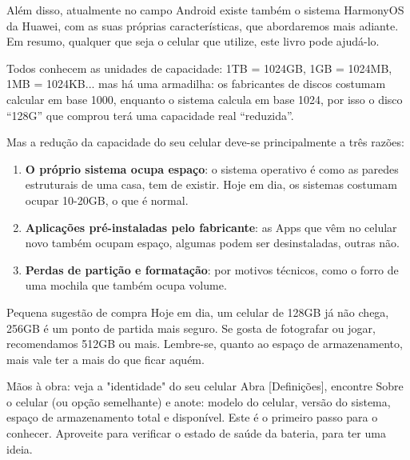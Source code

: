 Além disso, atualmente no campo Android existe também o sistema HarmonyOS da Huawei, com as suas próprias características, que abordaremos mais adiante. Em resumo, qualquer que seja o celular que utilize, este livro pode ajudá-lo.


Todos conhecem as unidades de capacidade: 1TB = 1024GB, 1GB = 1024MB, 1MB = 1024KB... mas há uma armadilha: os fabricantes de discos costumam calcular em base 1000, enquanto o sistema calcula em base 1024, por isso o disco “128G” que comprou terá uma capacidade real “reduzida”.

Mas a redução da capacidade do seu celular deve-se principalmente a três razões:

\begin{enumerate}
  \item \textbf{O próprio sistema ocupa espaço}: o sistema operativo é como as paredes estruturais de uma casa, tem de existir. Hoje em dia, os sistemas costumam ocupar 10-20GB, o que é normal.
  \item \textbf{Aplicações pré-instaladas pelo fabricante}: as Apps que vêm no celular novo também ocupam espaço, algumas podem ser desinstaladas, outras não.
  \item \textbf{Perdas de partição e formatação}: por motivos técnicos, como o forro de uma mochila que também ocupa volume.
\end{enumerate}

\begin{tcbinfo}{Pequena sugestão de compra}
Hoje em dia, um celular de 128GB já não chega, 256GB é um ponto de partida mais seguro. Se gosta de fotografar ou jogar, recomendamos 512GB ou mais. Lembre-se, quanto ao espaço de armazenamento, mais vale ter a mais do que ficar aquém.

\end{tcbinfo}

\begin{tcbpractice}{Mãos à obra: veja a "identidade" do seu celular}
Abra [Definições], encontre Sobre o celular (ou opção semelhante) e anote: modelo do celular, versão do sistema, espaço de armazenamento total e disponível. Este é o primeiro passo para o conhecer. Aproveite para verificar o estado de saúde da bateria, para ter uma ideia.

\end{tcbpractice}


